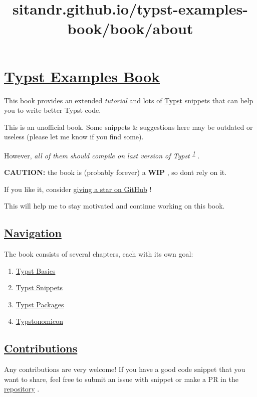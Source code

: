 \title{sitandr.github.io/typst-examples-book/book/about}

\section{\texorpdfstring{\hyperref[typst-examples-book]{Typst Examples
Book}}{Typst Examples Book}}\label{typst-examples-book}

This book provides an extended \emph{tutorial} and lots of
\href{https://github.com/typst/typst}{Typst} snippets that can help you
to write better Typst code.

This is an unofficial book. Some snippets \& suggestions here may be
outdated or useless (please let me know if you find some).

However, \emph{all of them should compile on last version of Typst
\textsuperscript{\hyperref[1]{1}}} .

\textbf{CAUTION:} the book is (probably forever) a \textbf{WIP} , so
don\textquotesingle t rely on it.

If you like it, consider
\href{https://github.com/sitandr/typst-examples-book}{giving a star on
GitHub} !

This will help me to stay motivated and continue working on this book.

\subsection{\texorpdfstring{\hyperref[navigation]{Navigation}}{Navigation}}\label{navigation}

The book consists of several chapters, each with its own goal:

\begin{enumerate}
\tightlist
\item
  \href{./basics/index.html}{Typst Basics}
\item
  \href{./snippets/index.html}{Typst Snippets}
\item
  \href{./packages/index.html}{Typst Packages}
\item
  \href{./typstonomicon/index.html}{Typstonomicon}
\end{enumerate}

\subsection{\texorpdfstring{\hyperref[contributions]{Contributions}}{Contributions}}\label{contributions}

Any contributions are very welcome! If you have a good code snippet that
you want to share, feel free to submit an issue with snippet or make a
PR in the
\href{https://github.com/sitandr/typst-examples-book}{repository} .

